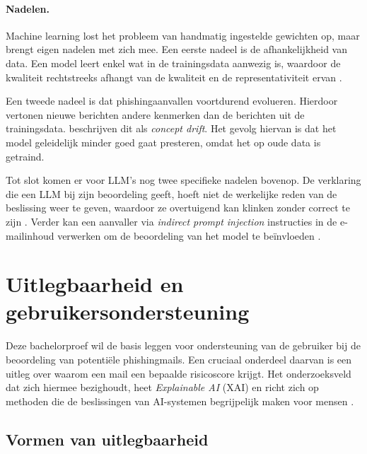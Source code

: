 \paragraph{Nadelen.}
\label{subsec:machinelearning-detectie:nadelen}
Machine learning lost het probleem van handmatig ingestelde gewichten op, maar brengt eigen nadelen met zich mee. Een eerste nadeel is de afhankelijkheid van data. Een model leert enkel wat in de trainingsdata aanwezig is, waardoor de kwaliteit rechtstreeks afhangt van de kwaliteit en de representativiteit ervan \autocite{Mendes2025}.

Een tweede nadeel is dat phishingaanvallen voortdurend evolueren. Hierdoor vertonen nieuwe berichten andere kenmerken dan de berichten uit de trainingsdata. \textcite{Fernando2026} beschrijven dit als \emph{concept drift}. Het gevolg hiervan is dat het model geleidelijk minder goed gaat presteren, omdat het op oude data is getraind.

Tot slot komen er voor LLM's nog twee specifieke nadelen bovenop. De verklaring die een LLM bij zijn beoordeling geeft, hoeft niet de werkelijke reden van de beslissing weer te geven, waardoor ze overtuigend kan klinken zonder correct te zijn \autocite{Turpin2023}. Verder kan een aanvaller via \emph{indirect prompt injection} instructies in de e-mailinhoud verwerken om de beoordeling van het model te beïnvloeden \autocite{Greshake2023}.

\section{Uitlegbaarheid en gebruikersondersteuning}%
\label{sec:uitlegbaarheid-gebruikersondersteuning}

Deze bachelorproef wil de basis leggen voor ondersteuning van de gebruiker bij de beoordeling van potentiële phishingmails. Een cruciaal onderdeel daarvan is een uitleg over waarom een mail een bepaalde risicoscore krijgt. Het onderzoeksveld dat zich hiermee bezighoudt, heet \emph{Explainable AI} (XAI) en richt zich op methoden die de beslissingen van AI-systemen begrijpelijk maken voor mensen \autocite{Guidotti2018}.

\subsection{Vormen van uitlegbaarheid}%
\label{subsec:vormen-van-uitlegbaarheid}

